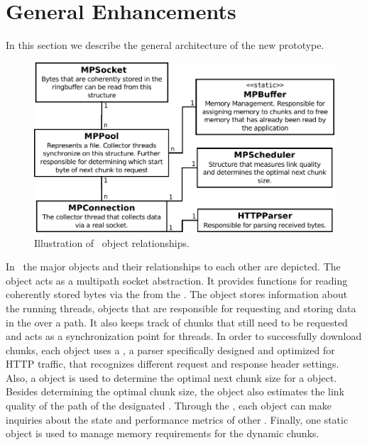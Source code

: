 \section{General Enhancements}
\label{sec:general-implementation}

In this section we describe the general architecture of the new prototype. 

\begin{figure}[ht]
		\centering
        \includegraphics[width=0.7\linewidth]{Figures/implementation-uml.pdf}
        \caption{Illustration of \protonew~object relationships.}
		\label{fig:implementation-uml}
		\vspace*{-0.3cm}
\end{figure}

In~ the major objects and their relationships to each other are depicted. 
The  object acts as a multipath socket abstraction. 
It provides functions for reading coherently stored bytes via the  from the . 
The  object stores information about the running  threads, \ie {} objects that are responsible for requesting and storing data in the  over a path.
It also keeps track of chunks that still need to be requested and acts as a synchronization point for  threads. 
In order to successfully download chunks, each  object uses a , \ie a parser specifically designed and optimized for HTTP traffic, that recognizes different request and response header settings. 
Also, a  object is used to determine the optimal next chunk size for a  object. 
Besides determining the optimal chunk size, the  object also estimates the link quality of the path of the designated . 
Through the , each  object can make inquiries about the state and performance metrics of other . 
Finally, one static  object is used to manage memory requirements for the dynamic chunks. 

